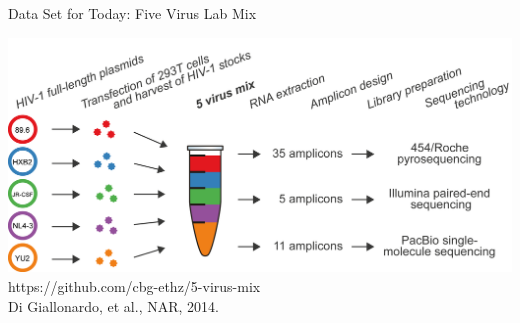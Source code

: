 \documentclass[notes=hide]{beamer}
\newcommand{\0}{\ensuremath{\mathtt{0}}}
\newcommand{\1}{\ensuremath{\mathtt{1}}}
\begin{document}
\begin{frame}{Data Set for Today: Five Virus Lab Mix}
 \begin{center}
\includegraphics[width=\textwidth]{figs/5vm_workflow.png}\\
{\tiny https://github.com/cbg-ethz/5-virus-mix\\ Di Giallonardo, et al., NAR, 2014.}
\end{center}
\end{frame}
\end{document}
